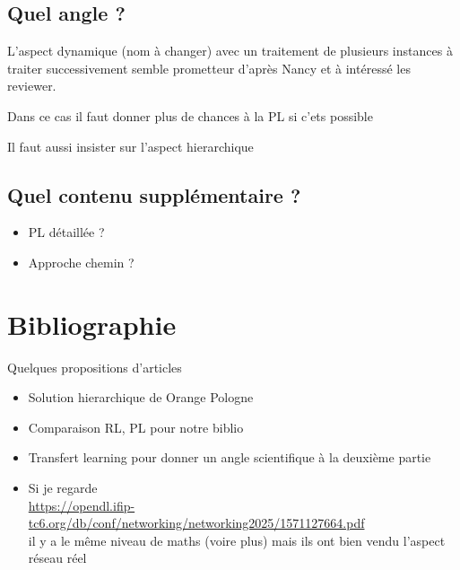 \documentclass[12pt,a4paper]{article}
\begin{document}
\subsection*{Quel angle ?}

L'aspect dynamique (nom à changer) avec un traitement de plusieurs instances à traiter successivement semble prometteur d’après Nancy et à intéressé les reviewer.

Dans ce cas il faut donner plus de chances à la PL si c'ets possible

Il faut aussi insister sur l'aspect hierarchique


\subsection*{Quel contenu supplémentaire ?}

\begin{itemize}
    \item  PL détaillée ?
    \item Approche chemin ?
\end{itemize}

\section*{Bibliographie}

Quelques propositions d'articles
\begin{itemize}
    \item Solution hierarchique de Orange Pologne
    \item Comparaison RL, PL pour notre biblio
    \item Transfert learning pour donner un angle scientifique à la deuxième partie
    \item Si je regarde\\
          \url{https://opendl.ifip-tc6.org/db/conf/networking/networking2025/1571127664.pdf} \\
          il y a le même niveau de maths (voire plus) mais  ils ont bien vendu l'aspect réseau réel
\end{itemize}
\end{document}
